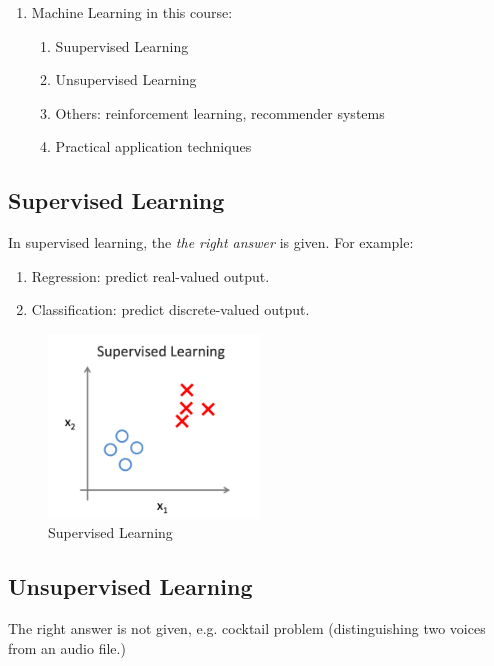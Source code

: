\documentclass[letter]{article}
\begin{document}
\begin{enumerate}
\begin{itemize}
\begin{quote}
                    \end{quote}
           \end{itemize}
        \item Machine Learning in this course:
            \begin{enumerate}
                \item Suupervised Learning
                \item Unsupervised Learning
                \item Others: reinforcement learning, recommender systems
                \item Practical application techniques
            \end{enumerate}
    \end{enumerate}

    
    \subsection{Supervised Learning}

        In supervised learning, the \emph{the right answer} is given. For example:
        \begin{enumerate}
            \item Regression: predict real-valued output.
            \item Classification: predict discrete-valued output.
        \end{enumerate}

    \begin{figure}[h]
        \centering
        \includegraphics[width=0.5\textwidth]{image/supervised-learning.png}
        \caption{Supervised Learning}
        \label{fig:supervised-learning}
    \end{figure}

    \subsection{Unsupervised Learning}
    The right answer is not given, e.g. cocktail problem (distinguishing two voices from an audio file.)
\end{document}
